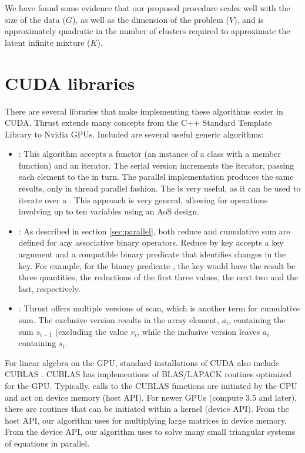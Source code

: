 We have found some evidence that our proposed procedure scales well with the size of the data ($G$), as well as the dimension of the problem ($V$), and is approximately quadratic in the number of clusters required to approximate the latent infinite mixture ($K$).

\appendix
\section{CUDA libraries}
There are several libraries that make implementing these algorithms easier in CUDA. Thrust \citep{thrust} extends many concepts from the C++ Standard Template Library to Nvidia GPUs. Included are several useful generic algorithms:
\begin{itemize}
\item {}: This algorithm accepts a functor (an
  instance of a class with a member  function)
  and an iterator. The serial version increments the iterator, passing
  each element to the  in turn. The parallel implementation
  produces the same results, only in thread parallel fashion. The
   is very useful, as it can be used
  to iterate
  over a . This approach is very general, allowing
  for operations involving up to ten variables using an AoS
  design.

\item {}: As described in section
  \ref{sec:parallel}, both reduce and cumulative sum are defined for any associative binary operators. Reduce by key accepts a key argument and a compatible binary predicate that identifies changes in the key. For example, for the binary predicate , the key  would have the result be three quantities, the reductions of the first three values, the next two and the last, respectively.

\item {}: Thrust
  offers multiple versions of scan, which is another term for cumulative sum. The exclusive
  version results in the array element, $a_i$, containing the sum $s_{i-1}$ (excluding the value $v_i$, while the inclusive version leaves $a_i$ containing $s_i$.
\end{itemize}

For linear algebra on the GPU, standard installations of CUDA also
include CUBLAS \cite{cublas}. CUBLAS has implementions of BLAS/LAPACK
routines optimized for the GPU. Typically, calls to the CUBLAS
functions are initiated by the CPU and act on device memory (host
API). For newer GPUs (compute 3.5 and later), there are routines that
can be initiated within a kernel (device API). From the host API, our
algorithm uses  for multiplying large matrices in
device memory. From the
device API, our algorithm uses  to solve many small triangular
systems of equations in parallel.

